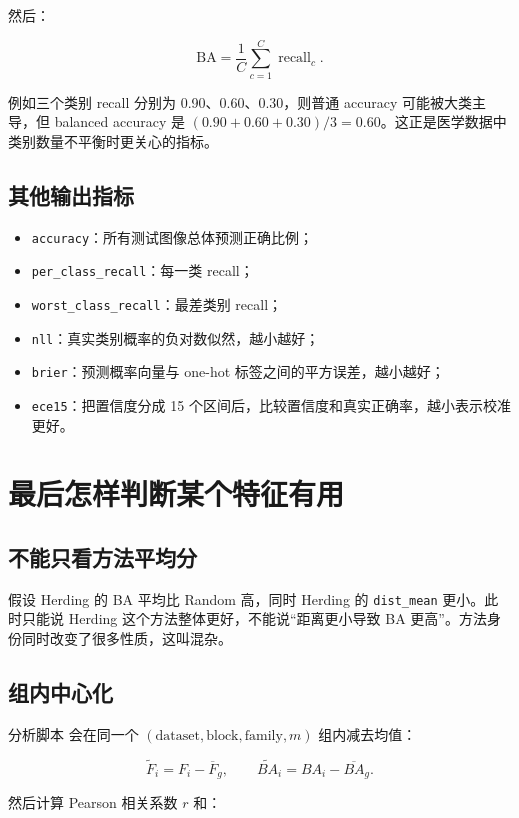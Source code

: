 \documentclass[UTF8,a4paper,12pt]{ctexart}
\newcommand{\code}[1]{\texttt{#1}}
\newcommand{\ba}{\mathrm{BA}}
\begin{document}
然后：

\[
\ba=\frac{1}{C}\sum_{c=1}^{C}\operatorname{recall}_c.
\]

例如三个类别 recall 分别为 0.90、0.60、0.30，则普通 accuracy 可能被大类主导，但 balanced accuracy 是
\((0.90+0.60+0.30)/3=0.60\)。这正是医学数据中类别数量不平衡时更关心的指标。

\subsection{其他输出指标}

\begin{itemize}
  \item \code{accuracy}：所有测试图像总体预测正确比例；
  \item \code{per\_class\_recall}：每一类 recall；
  \item \code{worst\_class\_recall}：最差类别 recall；
  \item \code{nll}：真实类别概率的负对数似然，越小越好；
  \item \code{brier}：预测概率向量与 one-hot 标签之间的平方误差，越小越好；
  \item \code{ece15}：把置信度分成 15 个区间后，比较置信度和真实正确率，越小表示校准更好。
\end{itemize}

\section{最后怎样判断某个特征有用}

\subsection{不能只看方法平均分}

假设 Herding 的 BA 平均比 Random 高，同时 Herding 的 \code{dist\_mean} 更小。此时只能说 Herding 这个方法整体更好，不能说“距离更小导致 BA 更高”。方法身份同时改变了很多性质，这叫混杂。

\subsection{组内中心化}

分析脚本  会在同一个
\((\text{dataset},\text{block},\text{family},m)\) 组内减去均值：

\[
\tilde F_i=F_i-\overline F_g,
\qquad
\widetilde{BA}_i=BA_i-\overline{BA}_g.
\]

然后计算 Pearson 相关系数 \(r\) 和：
\end{document}
